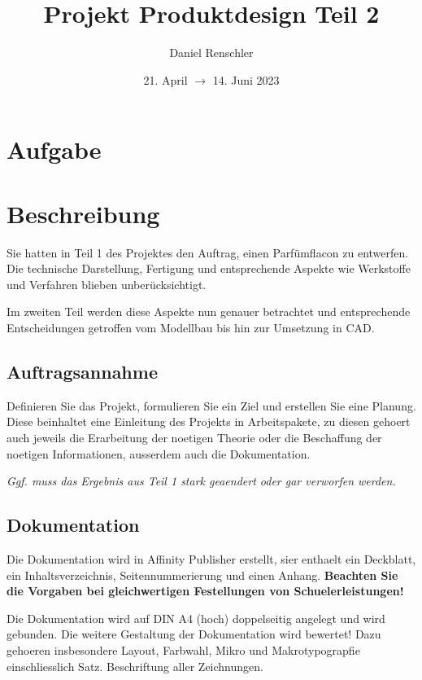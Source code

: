 \documentclass{report}
\title{Projekt Produktdesign Teil 2}
\author{Daniel Renschler}
\date{21. April $\to$ 14. Juni 2023}
\begin{document}
\maketitle

\tableofcontents
\clearpage


\section{Aufgabe}
\section{Beschreibung}
Sie hatten in Teil 1 des Projektes den Auftrag, einen Parf\"umflacon zu
entwerfen. Die technische Darstellung, Fertigung und entsprechende Aspekte wie
Werkstoffe und Verfahren blieben unber\"ucksichtigt.

Im zweiten Teil werden diese Aspekte nun genauer betrachtet und entsprechende
Entscheidungen getroffen vom Modellbau bis hin zur Umsetzung in CAD.


\subsection{Auftragsannahme}
Definieren Sie das Projekt, formulieren Sie ein Ziel und erstellen Sie eine
Planung. Diese beinhaltet eine Einleitung des Projekts in Arbeitspakete, zu
diesen gehoert auch jeweils die Erarbeitung der noetigen Theorie oder die
Beschaffung der noetigen Informationen, ausserdem auch die Dokumentation.

\textit{Ggf. muss das Ergebnis aus Teil 1 stark geaendert oder gar verworfen werden.}


\subsection{Dokumentation}
Die Dokumentation wird in Affinity Publisher erstellt, sier enthaelt ein
Deckblatt, ein Inhaltsverzeichnis, Seitennummerierung und einen Anhang.
\textbf{Beachten Sie die Vorgaben bei gleichwertigen Festellungen von
Schuelerleistungen!}

Die Dokumentation wird auf DIN A4 (hoch) doppelseitig angelegt und wird
gebunden. Die weitere Gestaltung der Dokumentation wird bewertet! Dazu gehoeren
insbesondere Layout, Farbwahl, Mikro und Makrotypograpfie einschliesslich Satz.
Beschriftung aller Zeichnungen.
\end{document}
